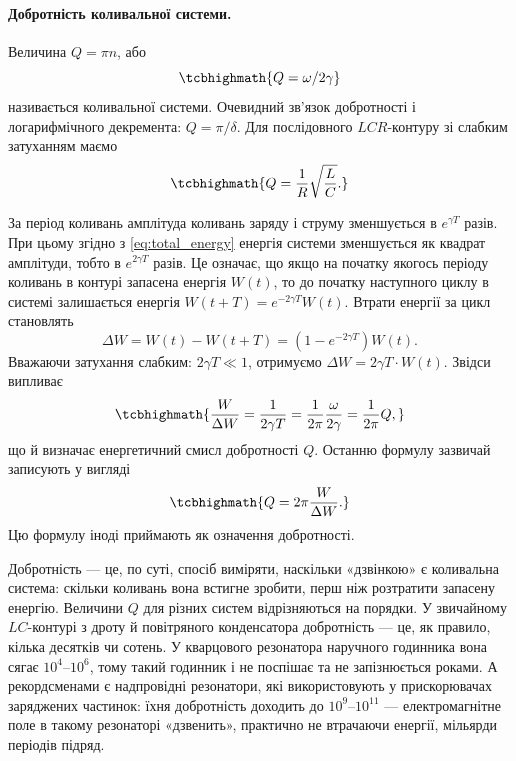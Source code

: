 \paragraph*{Добротність коливальної системи.}
Величина $Q = \pi n$, або
\begin{equation}\label{eq:quality_factor}
	\tcbhighmath{
		Q = \omega/2\gamma
	}
\end{equation}
називається  коливальної системи. Очевидний зв'язок
добротності і логарифмічного декремента: $Q = \pi/\delta$. Для послідовного $LCR$-контуру зі слабким затуханням маємо
\begin{equation}\label{eq:Q_LCR}
	\tcbhighmath{
		Q = \frac{1}{R}\sqrt{\frac{L}{C}}.
	}
\end{equation}

За період коливань амплітуда коливань заряду і струму зменшується в
$e^{\gamma T}$ разів. При цьому згідно з \eqref{eq:total_energy} енергія системи зменшується як квадрат амплітуди, тобто в $e^{2\gamma T}$ разів. Це означає, що якщо на початку якогось періоду коливань в контурі запасена енергія $W(t)$, то до початку
наступного циклу в системі залишається енергія $W(t + T) = e^{-2\gamma T}W(t)$. Втрати енергії за цикл становлять
\begin{equation}\label{eq:energy_loss_cycle}
	\Delta W = W(t) - W(t + T) = \left(1 - e^{-2\gamma T}\right)W(t).
\end{equation}
Вважаючи затухання слабким: $2\gamma T \ll 1$, отримуємо $\Delta W = 2\gamma T \cdot W(t)$. Звідси
випливає
\begin{equation}\label{eq:quality_energy}
	\tcbhighmath{
		\frac{W}{\Delta W} = \frac{1}{2\gamma T} = \frac{1}{2\pi}\frac{\omega}{2\gamma} = \frac{1}{2\pi}Q,
	}
\end{equation}
що й визначає енергетичний смисл добротності $Q$. Останню
формулу зазвичай записують у вигляді
\begin{equation}\label{eq:Q_definition}
	\tcbhighmath{
		Q = 2\pi\frac{W}{\Delta W}.
	}
\end{equation}
Цю формулу іноді приймають як означення добротності.

\begin{Attention}
	Добротність --- це, по суті, спосіб виміряти, наскільки «дзвінкою» є коливальна система: скільки коливань вона встигне зробити, перш ніж розтратити запасену енергію. Величини $Q$ для різних систем відрізняються на порядки. У звичайному $LC$-контурі з дроту й повітряного конденсатора добротність --- це, як правило, кілька десятків чи сотень. У кварцового резонатора наручного годинника вона сягає $10^{4}$--$10^{6}$, тому такий годинник і не поспішає та не запізнюється роками. А рекордсменами є надпровідні резонатори, які використовують у прискорювачах заряджених частинок: їхня добротність доходить до $10^{9}$--$10^{11}$ --- електромагнітне поле в такому резонаторі «дзвенить», практично не втрачаючи енергії, мільярди періодів підряд.
\end{Attention}


